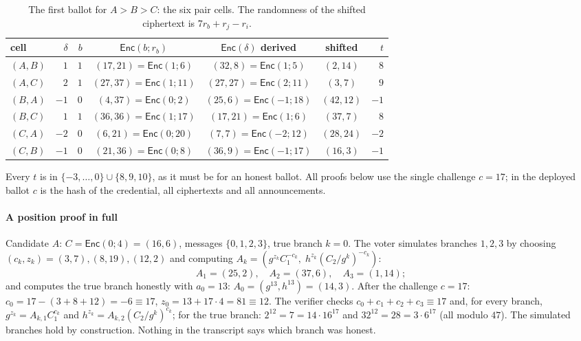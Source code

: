 \documentclass[11pt,a4paper]{article}
\newcommand{\Enc}{\mathsf{Enc}}
\theoremstyle{remark}
\begin{document}
\begin{table}[t]
\centering
\caption{The first ballot for $A > B > C$: the six pair cells. The
randomness of the shifted ciphertext is $7 r_b + r_j - r_i$.}
\label{tab:walk1}
\begin{tabular}{@{}lrrcccr@{}}
\toprule
cell & $\delta$ & $b$ & $\Enc(b; r_b)$ & $\Enc(\delta)$ derived & shifted & $t$ \\
\midrule
$(A,B)$ & $1$ & $1$ & $(17,21) = \Enc(1;6)$ & $(32,8) = \Enc(1;5)$ & $(2,14)$ & $8$ \\
$(A,C)$ & $2$ & $1$ & $(27,37) = \Enc(1;11)$ & $(27,27) = \Enc(2;11)$ & $(3,7)$ & $9$ \\
$(B,A)$ & $-1$ & $0$ & $(4,37) = \Enc(0;2)$ & $(25,6) = \Enc(-1;18)$ & $(42,12)$ & $-1$ \\
$(B,C)$ & $1$ & $1$ & $(36,36) = \Enc(1;17)$ & $(17,21) = \Enc(1;6)$ & $(37,7)$ & $8$ \\
$(C,A)$ & $-2$ & $0$ & $(6,21) = \Enc(0;20)$ & $(7,7) = \Enc(-2;12)$ & $(28,24)$ & $-2$ \\
$(C,B)$ & $-1$ & $0$ & $(21,36) = \Enc(0;8)$ & $(36,9) = \Enc(-1;17)$ & $(16,3)$ & $-1$ \\
\bottomrule
\end{tabular}
\end{table}

Every $t$ is in $\{-3, \ldots, 0\} \cup \{8, 9, 10\}$, as it must be for
an honest ballot. All proofs below use the single challenge $c = 17$; in
the deployed ballot $c$ is the hash of the credential, all ciphertexts and
all announcements.

\paragraph{A position proof in full} Candidate $A$: $C = \Enc(0; 4) =
(16, 6)$, messages $\{0, 1, 2, 3\}$, true branch $k = 0$. The voter
simulates branches $1, 2, 3$ by choosing $(c_k, z_k) = (3, 7), (8, 19),
(12, 2)$ and computing $A_k = (g^{z_k} C_1^{-c_k},\; h^{z_k} (C_2 /
g^{k})^{-c_k})$:
\[
  A_1 = (25, 2),\quad A_2 = (37, 6),\quad A_3 = (1, 14);
\]
and computes the true branch honestly with $a_0 = 13$: $A_0 = (g^{13},
h^{13}) = (14, 3)$. After the challenge $c = 17$: $c_0 = 17 - (3 + 8 +
12) = -6 \equiv 17$, $z_0 = 13 + 17 \cdot 4 = 81 \equiv 12$. The verifier
checks $c_0 + c_1 + c_2 + c_3 \equiv 17$ and, for every branch, $g^{z_k} =
A_{k,1} C_1^{c_k}$ and $h^{z_k} = A_{k,2} (C_2 / g^k)^{c_k}$; for the true
branch: $2^{12} = 7 = 14 \cdot 16^{17}$ and $32^{12} = 28 = 3 \cdot
6^{17}$ (all modulo $47$). The simulated branches hold by
construction. Nothing in the transcript says which branch was honest.
\end{document}
